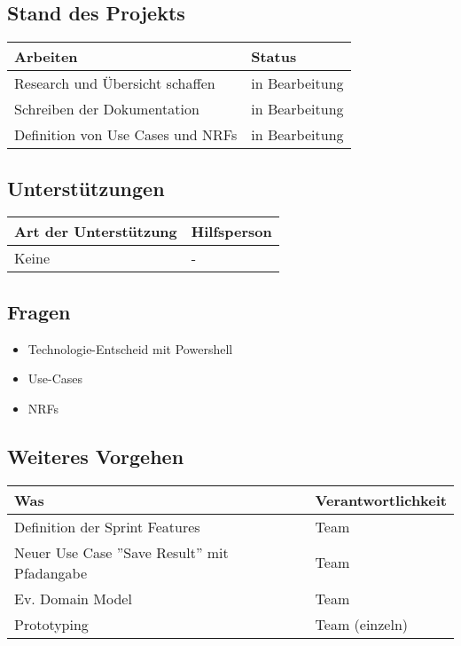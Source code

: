 \subsection*{Stand des Projekts}
\begin{table}[H]
    \centering
    \begin{tabular}{p{12cm} p{4cm}}
        \textbf{Arbeiten} & \textbf{Status} \\ \hline
        Research und Übersicht schaffen & in Bearbeitung \\ \hline
        Schreiben der Dokumentation & in Bearbeitung \\ \hline
        Definition von Use Cases und NRFs & in Bearbeitung \\ \hline
    \end{tabular}
\end{table}

\vspace{1cm}

\subsection*{Unterstützungen}
\begin{table}[H]
    \centering
    \begin{tabular}{p{12cm} p{4cm}}
        \textbf{Art der Unterstützung} & \textbf{Hilfsperson} \\ \hline
        Keine & - \\ \hline
    \end{tabular}
\end{table}

\vspace{1cm}

\subsection*{Fragen}
\begin{itemize}
    \item Technologie-Entscheid mit Powershell
    \item Use-Cases
    \item NRFs
\end{itemize}

\vspace{1cm}

\subsection*{Weiteres Vorgehen}
\begin{table}[H]
    \centering
    \begin{tabular}{p{12cm} p{4cm}}
        \textbf{Was} & \textbf{Verantwortlichkeit} \\ \hline
        Definition der Sprint Features & Team \\ \hline
        Neuer Use Case ''Save Result'' mit Pfadangabe & Team \\ \hline
        Ev. Domain Model & Team \\ \hline
        Prototyping & Team (einzeln) \\ \hline
    \end{tabular}
\end{table}

